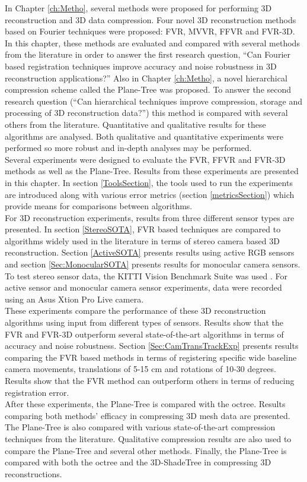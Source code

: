 
In Chapter \ref{ch:Metho}, several methods were proposed for performing 3D reconstruction and 3D data compression. Four novel 3D reconstruction methods based on Fourier techniques were proposed: FVR, MVVR, FFVR and FVR-3D. In this chapter, these methods are evaluated and compared with several methods from the literature in order to answer the first research question, ``Can Fourier based registration techniques improve accuracy and noise robustness in 3D reconstruction applications?'' Also in Chapter \ref{ch:Metho}, a novel hierarchical compression scheme called the Plane-Tree was proposed. To answer the second research question (``Can hierarchical techniques improve compression, storage and processing of 3D reconstruction data?'') this method is compared with several others from the literature. Quantitative and qualitative results for these algorithms are analysed. Both qualitative and quantitative experiments were performed so more robust and in-depth analyses may be performed. \\

Several experiments were designed to evaluate the FVR, FFVR and FVR-3D methods as well as the Plane-Tree. Results from these experiments are presented in this chapter. In section \ref{ToolsSection}, the tools used to run the experiments are introduced along with various error metrics (section \ref{metricsSection}) which provide means for comparisons between algorithms. \\

For 3D reconstruction experiments, results from three different sensor types are presented. In section \ref{StereoSOTA}, FVR based techniques are compared to algorithms widely used in the literature in terms of stereo camera based 3D reconstruction. Section \ref{ActiveSOTA} presents results using active RGB sensors and section \ref{Sec:MonocularSOTA} presents results for monocular camera sensors. To test stereo sensor data, the KITTI Vision Benchmark Suite was used \cite{Geiger13Vision}. For active sensor and monocular camera sensor experiments, data were recorded using an Asus Xtion Pro Live camera. \\

These experiments compare the performance of these 3D reconstruction algorithms using input from different types of sensors. Results show that the FVR and FVR-3D outperform several state-of-the-art algorithms in terms of accuracy and noise robustness. Section \ref{Sec:CamTransTrackExp} presents results comparing the FVR based methods in terms of registering specific wide baseline camera movements, translations of 5-15 cm and rotations of 10-30 degrees. Results show that the FVR method can outperform others in terms of reducing registration error. \\

After these experiments, the Plane-Tree is compared with the octree. Results comparing both methods' efficacy in compressing 3D mesh data are presented. The Plane-Tree is also compared with various state-of-the-art compression techniques from the literature. Qualitative compression results are also used to compare the Plane-Tree and several other methods. Finally, the Plane-Tree is compared with both the octree and the 3D-ShadeTree in compressing 3D reconstructions. \\
